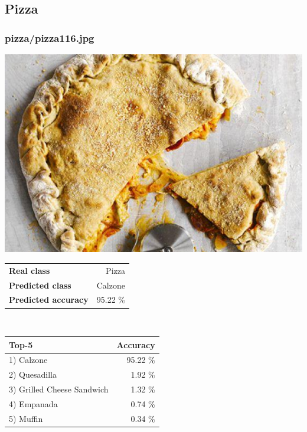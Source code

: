 \subsection{Pizza}
    
\subsubsection{pizza/pizza116.jpg}

\begin{minipage}[t]{0.4\textwidth}
	\vspace{0pt}
	\includegraphics[width=\linewidth]{images/evaluation-images/pizza/pizza116.jpg}
\end{minipage}
\hfill
\begin{minipage}[t]{0.5\textwidth}
	\vspace{0pt}\raggedright
	\begin{tabularx}{\textwidth}{X r}
		\small \textbf{Real class} & \small Pizza\\
		\small \textbf{Predicted class} & \small Calzone\\
		\small \textbf{Predicted accuracy} & \small 95.22 \%
    \end{tabularx}\\
    
    \vspace{6pt}
	\begin{tabularx}{\textwidth}{X r}
        \small \textbf{Top-5} & \small \textbf{Accuracy} \\
        \hline
		\small 1) Calzone & \small 95.22 \%\\\small 2) Quesadilla & \small 1.92 \%\\\small 3) Grilled Cheese Sandwich & \small 1.32 \%\\\small 4) Empanada & \small 0.74 \%\\\small 5) Muffin & \small 0.34 \%
    \end{tabularx}
\end{minipage}
    
